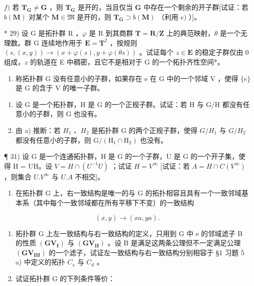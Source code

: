 \(f)\) 若 \(\mathbf{T}_{\mathbf{G}} \neq \mathbf{G}\) ，则 \(\mathbf{T}_{\mathbf{G}}\) 是开的，当且仅当 \(\mathbf{G}\) 中存在一个剩余的开子群{[}试证：若 \(b(\mathbf{M})\) 对某个 \(\mathbf{M} \in \mathfrak{M}\) 是开的，则 \(\mathbf{T}_{\mathbf{G}} \supset b(\mathbf{M})\) （利用 \(e)\) ）{]}。

* 29) 设 G 是拓扑群 R ，\(\varphi\) 是 R 到其商群 \(\mathbf{T} = \mathbf{R} / \mathbf{Z}\) 上的典范映射，\(\theta\) 是一个无理数。群 G 连续地作用于 \(\mathbf{E} = \mathbf{T}^2\) ，按规则 \((s, (x, y)) \to (x + \varphi(s), y + \varphi(\theta s))\) 。试证每个 \(z \in \mathbf{E}\) 的稳定子群仅由 0 组成，\(z\) 的轨道在 E 中稠密，且它不是相对于 G 的一个拓扑齐性空间*。

\begin{enumerate}
\def\labelenumi{\arabic{enumi})}
\setcounter{enumi}{29}
\tightlist
\item
  称拓扑群 G 没有任意小的子群，如果存在 e 在 G 中的一个邻域 V ，使得 \(\{e\}\) 是 G 的含于 V 的唯一子群。
\end{enumerate}

\begin{enumerate}
\def\labelenumi{\alph{enumi})}
\item
  设 G 是一个拓扑群，H 是 G 的一个正规子群。试证：若 H 与 G/H 都没有任意小的子群，则 G 也没有。
\item
  由 a) 推断：若 \(H_{1}\) 、\(H_{2}\) 是拓扑群 G 的两个正规子群，使得 \(G/H_{1}\) 与 \(G/H_{2}\) 都没有任意小的子群，则 \(\mathrm{G}/(\mathrm{H}_{1} \cap \mathrm{H}_{2})\) 也没有。
\end{enumerate}

¶ 31) 设 G 是一个连通拓扑群，H 是 G 的一个子群，U 是 G 的一个开子集，使得 H = UH。设 \(V = H \cap (U^{-1}U)\) ；试证 \(H = V^{\infty}\) {[}试证：若 \(A = H \cap C(V^{\infty})\)，则集合 \(U.V^{\infty}\) 与 \(U.A\) 不相交{]}。

\BourbakiExerciseGroup

\begin{enumerate}
\def\labelenumi{\arabic{enumi})}
\tightlist
\item
  在拓扑群 G 上，右一致结构是唯一的与 G 的拓扑相容且具有一个一致邻域基本系（其中每个一致邻域都在所有平移下不变）的一致结构
\end{enumerate}

\[
(x, y) \rightarrow (x a, y a).
\]

\begin{enumerate}
\def\labelenumi{\arabic{enumi})}
\setcounter{enumi}{1}
\item
  拓扑群 G 上左一致结构与右一致结构的定义，只用到 G 中 e 的邻域滤子 B 的性质 \((\mathbf{GV}_{\mathbf{I}})\) 与 \((\mathbf{GV}_{\mathbf{II}})\) 。设 B 是满足这两条公理但不一定满足公理 \((\mathbf{GV}_{\mathbf{III}})\) 的一个滤子，试证左一致结构与右一致结构分别相容于 §1 习题 5 a) 中定义的拓扑 \(C_{s}\) 与 \(C_{d}\) 。
\item
  试证拓扑群 G 的下列条件等价：
\end{enumerate}

